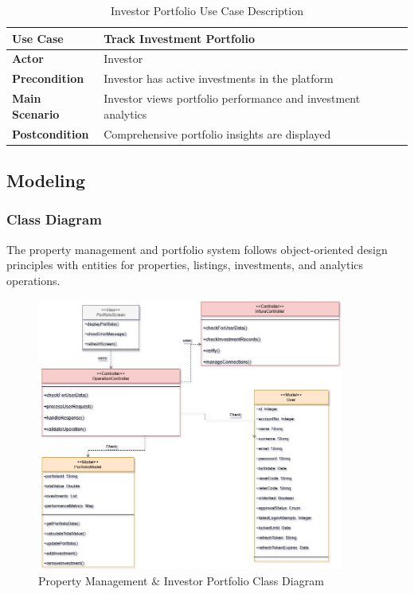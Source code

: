 \begin{table}[htbp]
    \centering
    \begin{tabular}{|p{3cm}|p{10cm}|}
        \hline
        \textbf{Use Case} & \textbf{Track Investment Portfolio} \\
        \hline
        \textbf{Actor} & Investor \\
        \hline
        \textbf{Precondition} & Investor has active investments in the platform \\
        \hline
        \textbf{Main Scenario} & Investor views portfolio performance and investment analytics \\
        \hline
        \textbf{Postcondition} & Comprehensive portfolio insights are displayed \\
        \hline
    \end{tabular}
    \caption{Investor Portfolio Use Case Description}
    \label{tab:investor-portfolio-use-case}
\end{table}

\newpage
\subsection{Modeling}
\subsubsection{Class Diagram}
The property management and portfolio system follows object-oriented design principles with entities for properties, listings, investments, and analytics operations.

\begin{figure}[htbp]
    \centering
    \includegraphics[width=0.9\textwidth]{images/property_portfolio_class_diagram.png}
    \caption{Property Management \& Investor Portfolio Class Diagram}
    \label{fig:property-portfolio-class}
\end{figure}

